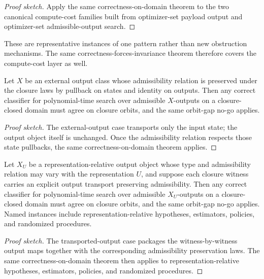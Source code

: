 \begin{proof}[Proof sketch]
Apply the same correctness-on-domain theorem to the two canonical compute-cost families built from optimizer-set payload output and optimizer-set admissible-output search.
\end{proof}

These are representative instances of one pattern rather than new obstruction mechanisms. The same correctness-forces-invariance theorem therefore covers the compute-cost layer as well.

\begin{corollary}\label{cor:external-output-compute-classifier-forces-invariance}
Let $X$ be an external output class whose admissibility relation is preserved under the closure laws by pullback on states and identity on outputs. Then any correct classifier for polynomial-time search over admissible $X$-outputs on a closure-closed domain must agree on closure orbits, and the same orbit-gap no-go applies.
\end{corollary}

\begin{proof}[Proof sketch]
The external-output case transports only the input state; the output object itself is unchanged. Once the admissibility relation respects those state pullbacks, the same correctness-on-domain theorem applies.
\end{proof}

\begin{corollary}\label{cor:transported-output-compute-classifier-forces-invariance}
Let $X_U$ be a representation-relative output object whose type and admissibility relation may vary with the representation $U$, and suppose each closure witness carries an explicit output transport preserving admissibility. Then any correct classifier for polynomial-time search over admissible $X_U$-outputs on a closure-closed domain must agree on closure orbits, and the same orbit-gap no-go applies. Named instances include representation-relative hypotheses, estimators, policies, and randomized procedures.
\end{corollary}

\begin{proof}[Proof sketch]
The transported-output case packages the witness-by-witness output maps together with the corresponding admissibility preservation laws. The same correctness-on-domain theorem then applies to representation-relative hypotheses, estimators, policies, and randomized procedures.
\end{proof}

